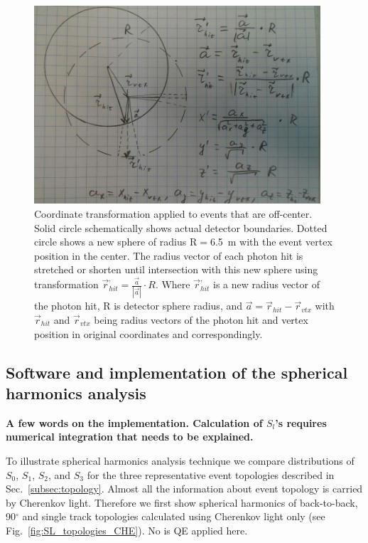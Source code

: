 \documentclass[12pt,twoside,letterpaper]{article}
\begin{document}
\begin{figure}[htb]
\centering
\includegraphics[angle=0,width=0.95\textwidth]{plots/SphH_transform_sketch.JPG}
\caption{Coordinate transformation applied to events that are off-center. Solid circle schematically shows actual detector boundaries. Dotted circle shows a new sphere of radius R$=$6.5~m with the event vertex position in the center. The radius vector of each photon hit is stretched or shorten until intersection with this new sphere using transformation $\vec{r}^{,}_{hit} = \frac{\vec{a}}{|\vec{a}|} \cdot R$. Where $\vec{r}^{,}_{hit}$ is a new radius vector of the photon hit, R is detector sphere radius, and $\vec{a}=\vec{r}_{hit} - \vec{r}_{vtx}$ with $\vec{r}_{hit}$ and $\vec{r}_{vtx}$ being radius vectors of the photon hit and vertex position in original coordinates and correspondingly.}
\label{fig:SphH_transform}
\end{figure}


\subsection{Software and implementation of the spherical harmonics analysis}
{\bf A few words on the implementation. Calculation of $S_l$'s requires numerical integration that needs to be explained.}

To illustrate spherical harmonics analysis technique we compare distributions of $S_0$, $S_1$, $S_2$, and $S_3$ for the three representative event topologies described in Sec.~\ref{subsec:topology}. Almost all the information about event topology is carried by Cherenkov light. Therefore we first show spherical harmonics of back-to-back,  90$^{\circ}$ and single track topologies calculated using Cherenkov light only (see Fig.~\ref{fig:SL_topologies_CHE}). No is QE applied here.
\end{document}
